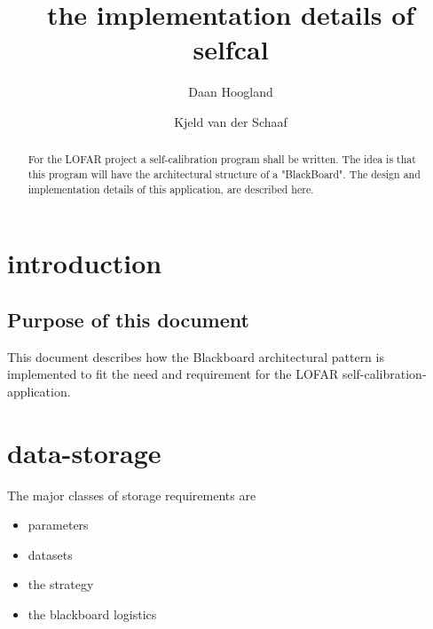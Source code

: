 \documentclass[]{lofar}
\title{the implementation details of selfcal}
\author{Daan Hoogland \and Kjeld van der Schaaf}
\begin{document}
\maketitle

\begin{abstract}



    For the LOFAR project a self-calibration program shall be
    written. The idea is that this program will have the architectural
    structure of a "BlackBoard". The design and implementation details
    of this application, are described here.

   
\end{abstract}



\section{introduction}
\label{id2719843}\hypertarget{id2719843}{}%

\subsection{Purpose of this document}
\label{id2719820}\hypertarget{id2719820}{}%



    This document describes how the Blackboard architectural pattern
    is implemented to fit the need and requirement for the LOFAR
    self-calibration-application.

   


\section{data-storage}
\label{id2719754}\hypertarget{id2719754}{}%



   The major classes of storage requirements are

   \begin{itemize}

	\item 


      parameters

     


	\item 


      datasets

     


	\item 


      the strategy

     


	\item 


      the blackboard logistics

     

\end{itemize}
\end{document}
